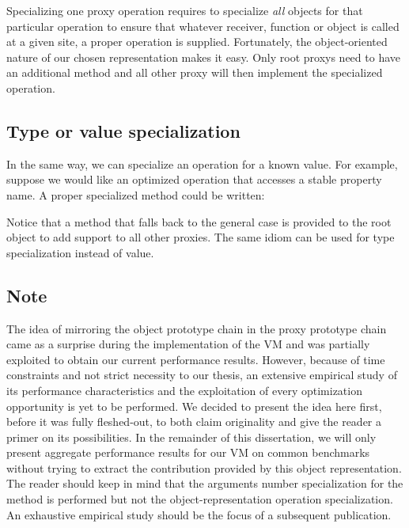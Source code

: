 
Specializing one proxy operation requires to specialize \textit{all} objects
for that particular operation to ensure that whatever receiver, function or
object is called at a given site, a proper operation is supplied. Fortunately,
the object-oriented nature of our chosen representation makes it easy. Only
root proxys need to have an additional method and all other proxy will then
implement the specialized operation.

\subsection{Type or value specialization}

In the same way, we can specialize an operation for a known value. For
example, suppose we would like an optimized operation that accesses a stable
property name. A proper specialized method could be written:


Notice that a method that falls back to the general case is provided to the
root object to add support to all other proxies. The same idiom can be used for
type specialization instead of value.

\subsection{Note}

The idea of mirroring the object prototype chain in the proxy prototype chain
came as a surprise during the implementation of the VM and was partially
exploited to obtain our current performance results. However, because of time
constraints and not strict necessity to our thesis, an extensive empirical
study of its performance characteristics and the exploitation of every
optimization opportunity is yet to be performed. We decided to present the idea
here first, before it was fully fleshed-out, to both claim originality and give
the reader a primer on its possibilities. In the remainder of this
dissertation, we will only present aggregate performance results for our VM on
common benchmarks without trying to extract the contribution provided by this
object representation. The reader should keep in mind that the arguments number
specialization for the  method is performed but not the
object-representation operation specialization. An exhaustive empirical study
should be the focus of a subsequent publication.

